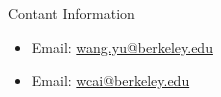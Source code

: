 \documentclass[final]{beamer}
\newlength{\onecolwid}
\begin{document}
\begin{frame}[t]
\begin{columns}[t]
\begin{column}{\onecolwid}
\begin{block}{Contant Information}
\begin{itemize}
\item Email: \href{mailto:wang.yu@berkeley.edu}{wang.yu@berkeley.edu}
\item Email: \href{mailto:wcai@berkeley.edu}{wcai@berkeley.edu}
\end{itemize}


\end{block}


\end{column} %

\end{columns} %

\end{frame} %
\end{document}
